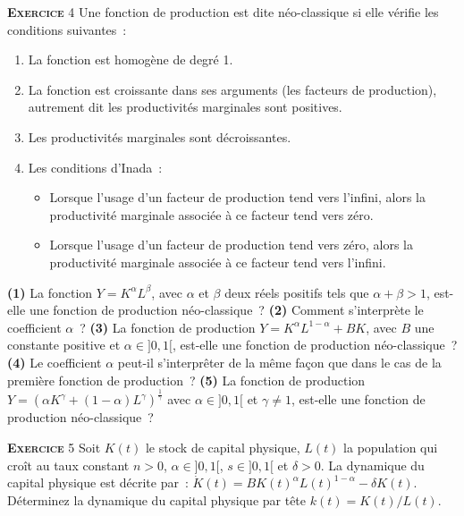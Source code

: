 \documentclass[10pt,a4paper,notitlepage]{article}
\newcommand{\exercice}[1]{\textsc{\textbf{Exercice}} #1}
\newcommand{\question}[1]{\textbf{(#1)}}
\begin{document}
\exercice{4} Une fonction de production est dite néo-classique si elle
vérifie les conditions suivantes :
\begin{enumerate}
\item La fonction est homogène de degré 1.
\item La fonction  est croissante dans ses arguments  (les facteurs de
  production),  autrement   dit  les  productivités   marginales  sont
  positives.
\item Les productivités marginales sont décroissantes.
\item Les conditions d'Inada : 
\begin{itemize}
\item Lorsque l'usage  d'un facteur de production  tend vers l'infini,
  alors  la productivité  marginale associée  à ce  facteur tend  vers
  zéro.
\item Lorsque l'usage d'un facteur de production tend vers zéro, alors
  la productivité marginale associée à ce facteur tend vers l'infini.
\end{itemize}
\end{enumerate}
\question{1} La fonction $Y=K^{\alpha}L^{\beta}$, avec $\alpha$ et
$\beta$ deux réels positifs tels que $\alpha+\beta > 1$, est-elle une
fonction de production néo-classique ?  \question{2} Comment
s'interprète le coefficient $\alpha$ ? \question{3} La fonction de
production $Y=K^{\alpha}L^{1-\alpha}+BK$, avec $B$ une constante
positive et $\alpha \in ]0,1[$, est-elle une fonction de production
néo-classique ?  \question{4} Le coefficient $\alpha$ peut-il
s'interprêter de la même façon que dans le cas de la première fonction
de production ?  \question{5} La fonction de production
$Y=\left(\alpha
  K^{\gamma}+(1-\alpha)L^{\gamma}\right)^{\frac{1}{\gamma}}$ avec
$\alpha\in]0,1[$ et $\gamma\neq 1$, est-elle une fonction de
production néo-classique ?\newline

\exercice{5}  Soit $K(t)$  le  stock de  capital  physique, $L(t)$  la
population qui  croît au taux  constant $n>0$, $\alpha \in  ]0,1[$, $s
\in  ]0,1[$  et $\delta>0$.   La  dynamique  du capital  physique  est
décrite par~: $\dot{K}(t)=BK(t)^{\alpha}L(t)^{1-\alpha}-\delta K(t)$.
Déterminez la dynamique du capital physique par tête $k(t)=K(t)/L(t)$.
\end{document}
